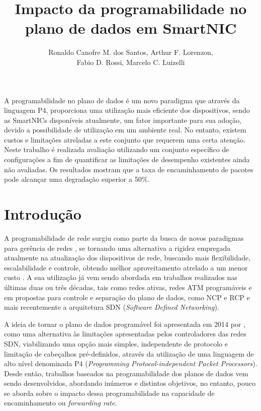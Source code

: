 \documentclass[12pt]{article}
\title{Impacto da programabilidade no plano de dados em SmartNIC}
\author{Ronaldo Canofre M. dos Santos, Arthur F. Lorenzon,\\ Fabio D. Rossi, Marcelo C. Luizelli}
\begin{document}
 
\maketitle

\begin{resumo}
A programabilidade no plano de dados é um novo paradigma que através da linguagem P4, proporciona uma utilização mais eficiente dos dispositivos, sendo as SmartNICs disponíveis atualmente, um fator importante para sua adoção, devido a possibilidade de utilização em um ambiente real. No entanto, existem custos e limitações atreladas a este conjunto que requerem uma certa atenção. Neste trabalho é realizada avaliação utilizando um conjunto específico de configurações a fim de quantificar as limitações de desempenho existentes ainda não avaliadas. Os resultados mostram que a taxa de encaminhamento de pacotes pode alcançar uma degradação superior a 50\%.
\end{resumo}



\section{Introdução} \label{sec:intro}

A programabilidade de rede surgiu como parte da busca de novos paradigmas para gerência de redes \cite{arquitetura_programavel_18}, se tornando uma alternativa a rigidez empregada  atualmente na atualização dos dispositivos de rede, buscando mais flexibilidade, escalabilidade e controle, obtendo melhor aproveitamento atrelado a um menor custo \cite{revolucao_redes_p4_18}. A sua utilização já vem sendo abordada em trabalhos realizados nas últimas duas ou três décadas, tais como redes ativas, redes ATM programáveis e em propostas para controle e separação do plano de dados, como NCP e RCP \cite{sdn_survey_15} e mais recentemente a arquitetura SDN (\textit{Software Defined Networking}).

A ideia de tornar o  plano de dados programável foi apresentada em 2014 por \cite{p4_14}, como uma alternativa às limitações apresentadas pelos controladores das redes SDN, viabilizando uma opção mais simples, independente de protocolo e limitação de cabeçalhos pré-definidos, através da utilização de uma linguagem de alto nível denominada P4 (\textit{Programming  Protocol-independent  Packet  Processors}). Desde então, trabalhos baseados na programabilidade dos planos de dados vem sendo desenvolvidos, abordando inúmeros e distintos objetivos, no entanto, pouco se aborda sobre o impacto dessa programabilidade na capacidade de encaminhamento ou \textit{forwarding rate}.
\end{document}
